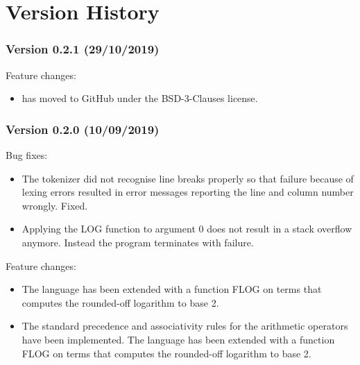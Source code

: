 \documentclass[twoside]{article}
\begin{document}
\section{Version History}



\subsubsection*{Version 0.2.1 (29/10/2019)}

Feature changes:
\begin{itemize}
\item \DiMo has moved to GitHub under the BSD-3-Clauses license.
\end{itemize}


\subsubsection*{Version 0.2.0 (10/09/2019)}

Bug fixes:
\begin{itemize}
\item The tokenizer did not recognise line breaks properly so that failure because of lexing errors resulted in error messages reporting the line and column number wrongly. Fixed.
\item Applying the LOG function to argument 0 does not result in a stack overflow anymore. Instead the program terminates with failure. 
\end{itemize}
Feature changes:
\begin{itemize}
\item The \DiMo language has been extended with a function FLOG on terms that computes the rounded-off logarithm to base 2.
\item The standard precedence and associativity rules for the arithmetic operators have been implemented. The \DiMo language has been extended with a function FLOG on terms that computes the rounded-off logarithm to base 2.
\end{itemize}
\end{document}
